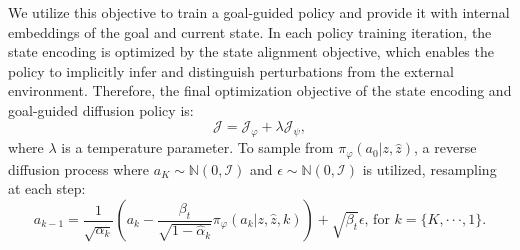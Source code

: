 We utilize this objective to train a goal-guided policy and provide it with internal embeddings of the goal and current state. 
In each policy training iteration, the state encoding is optimized by the state alignment objective, which enables the policy to implicitly infer and distinguish perturbations from the external environment. 
Therefore, the final optimization objective of the state encoding and goal-guided diffusion policy is:
\begin{equation}
\mathcal{J}=\mathcal{J}_{\varphi}+\lambda\mathcal{J}_{\psi},   
\end{equation}
where $\lambda$ is a temperature parameter.
To sample from $\pi_{\varphi}(a_0|z,\widehat{z})$, a reverse diffusion process where $a_K \sim \mathbb{N}(0,\mathcal{I}) $ and $\epsilon\sim\mathbb{N}(0,\mathcal{I})$ is utilized, resampling at each step:
\begin{equation}
a_{k-1}=\frac{1}{\sqrt{\alpha_k}}(a_k-\frac{\beta_t}{\sqrt{1-\widehat{\alpha}_k}}\pi_{\varphi}(a_k|z,\widehat{z},k))+\sqrt{\beta_t}\epsilon \text{, for } k= \{K,\cdot\cdot\cdot,1\}.
\end{equation}

